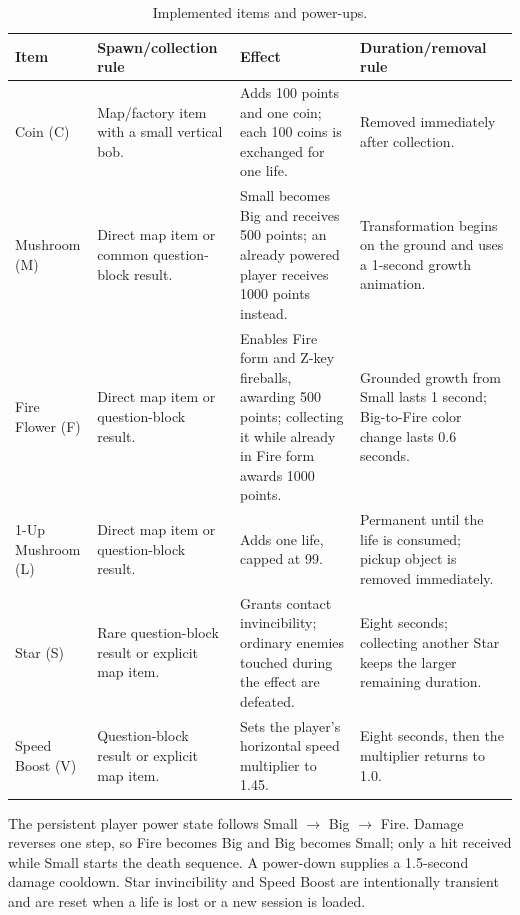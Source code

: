 \documentclass{template}
\begin{document}
\begin{table}[htbp]
    \centering
    \caption{Implemented items and power-ups.}
    \label{tab:items}
    \small
    \begin{tabularx}{\textwidth}{@{}p{2.1cm}XXX@{}}
        \toprule
        \textbf{Item} & \textbf{Spawn/collection rule} &
        \textbf{Effect} & \textbf{Duration/removal rule} \\
        \midrule
        Coin (C) & Map/factory item with a small vertical bob. & Adds 100
        points and one coin; each 100 coins is exchanged for one life. & Removed
        immediately after collection. \\
        Mushroom (M) & Direct map item or common question-block result. & Small
        becomes Big and receives 500 points; an already powered player receives
        1000 points instead. & Transformation begins on the ground and uses a
        1-second growth animation. \\
        Fire Flower (F) & Direct map item or question-block result. & Enables
        Fire form and Z-key fireballs, awarding 500 points; collecting it while
        already in Fire form awards 1000 points. & Grounded growth from Small
        lasts 1 second; Big-to-Fire color change lasts 0.6 seconds. \\
        1-Up Mushroom (L) & Direct map item or question-block result. & Adds one
        life, capped at 99. & Permanent until the life is consumed; pickup
        object is removed immediately. \\
        Star (S) & Rare question-block result or explicit map item. & Grants
        contact invincibility; ordinary enemies touched during the effect are
        defeated. & Eight seconds; collecting another Star keeps the larger
        remaining duration. \\
        Speed Boost (V) & Question-block result or explicit map item. & Sets the
        player's horizontal speed multiplier to 1.45. & Eight seconds, then the
        multiplier returns to 1.0. \\
        \bottomrule
    \end{tabularx}
\end{table}

The persistent player power state follows Small $\rightarrow$ Big
$\rightarrow$ Fire. Damage reverses one step, so Fire becomes Big and Big
becomes Small; only a hit received while Small starts the death sequence. A
power-down supplies a 1.5-second damage cooldown. Star invincibility and Speed
Boost are intentionally transient and are reset when a life is lost or a new
session is loaded.
\end{document}
